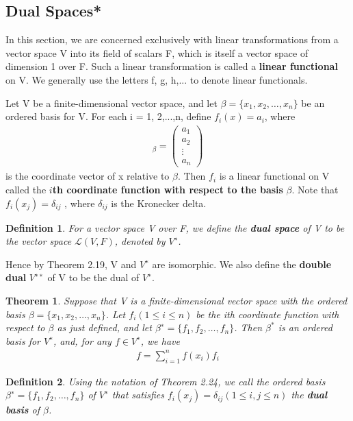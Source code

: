 \documentclass{article}
\newcommand{\bd}[1]{\textbf{#1}}
\newcommand*\bpmat[0]{\begin{pmatrix}}
\newcommand*\epmat[0]{\end{pmatrix}}
\theoremstyle{plain}
\newtheorem{theorem}{Theorem}[section]
\newtheorem*{definition1}{Definition}
\theoremstyle{plain} %
\begin{document}
\subsection {Dual Spaces*}

In this section, we are concerned exclusively with linear transformations from a vector space V into its field of scalars F, which is itself a vector space of dimension 1 over F. Such a linear transformation is called a \bd{linear functional} on V. We generally use the letters f, g, h,... to denote linear functionals.

Let V be a finite-dimensional vector space, and let $\beta = \{x_1, x_2,\ldots,x_n\}$ be an ordered basis for V. For each i = 1, 2,...,n, define $f_i(x) = a_i$, where
\begin{align*}
[x]_\beta = \bpmat a_1\\a_2\\ \vdots\\a_n\epmat
\end{align*}
is the coordinate vector of x relative to $\beta$. Then $f_i$ is a linear functional on V called the \bd{$i$th coordinate function with respect to the basis} $\beta$. Note that $f_i(x_j) = \delta_{ij}$ , where $\delta_{ij}$ is the Kronecker delta.

\begin{definition1}
For a vector space V over F, we define the \bd{dual space} of V to be the vector space $\mathcal L(V, F)$, denoted by $V^∗$.
\end{definition1}

Hence by Theorem 2.19, V and $V^∗$ are isomorphic. We also define the \bd{double dual} $V^{∗∗}$ of V to be the dual of $V^∗$.

\begin{theorem}
Suppose that V is a finite-dimensional vector space with the ordered basis $\beta = \{x_1, x_2,\ldots,x_n\}$. Let $f_i (1 \leq  i \leq n)$ be the ith coordinate function with respect to $\beta$ as just defined, and let $\beta^∗ = \{f_1, f_2,\ldots, f_n\}$. Then $\beta^*$ is an ordered basis for $V^∗$, and, for any $f \in V^∗$, we have
\begin{align*}
f=\sum_{i=1}^n f(x_i)f_i
\end{align*}
\end{theorem}

\begin{definition1}
Using the notation of Theorem 2.24, we call the ordered basis $\beta^∗ = \{f_1, f_2,\ldots, f_n\}$ of $V^∗$ that satisfies $f_i(x_j) = \delta_{ij} (1 \leq  i, j \leq n)$ the \bd{dual basis} of $\beta$.
\end{definition1}
\end{document}
